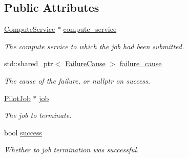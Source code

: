 \subsection*{Public Attributes}
\begin{DoxyCompactItemize}
\item 
\mbox{\label{classwrench_1_1_compute_service_terminate_pilot_job_answer_message_a7975aff8b6494bad7ee424d3afae8d1b}} 
\hyperlink{classwrench_1_1_compute_service}{Compute\+Service} $\ast$ \hyperlink{classwrench_1_1_compute_service_terminate_pilot_job_answer_message_a7975aff8b6494bad7ee424d3afae8d1b}{compute\+\_\+service}
\begin{DoxyCompactList}\small\item\em The compute service to which the job had been submitted. \end{DoxyCompactList}\item 
\mbox{\label{classwrench_1_1_compute_service_terminate_pilot_job_answer_message_afeeb546d25637b2ff8eb39b70b51e121}} 
std\+::shared\+\_\+ptr$<$ \hyperlink{classwrench_1_1_failure_cause}{Failure\+Cause} $>$ \hyperlink{classwrench_1_1_compute_service_terminate_pilot_job_answer_message_afeeb546d25637b2ff8eb39b70b51e121}{failure\+\_\+cause}
\begin{DoxyCompactList}\small\item\em The cause of the failure, or nullptr on success. \end{DoxyCompactList}\item 
\mbox{\label{classwrench_1_1_compute_service_terminate_pilot_job_answer_message_acc822617ab272e1f5a200af96c10090e}} 
\hyperlink{classwrench_1_1_pilot_job}{Pilot\+Job} $\ast$ \hyperlink{classwrench_1_1_compute_service_terminate_pilot_job_answer_message_acc822617ab272e1f5a200af96c10090e}{job}
\begin{DoxyCompactList}\small\item\em The job to terminate. \end{DoxyCompactList}\item 
\mbox{\label{classwrench_1_1_compute_service_terminate_pilot_job_answer_message_afa2b6acd7eb6b7ad23470402ef2badf0}} 
bool \hyperlink{classwrench_1_1_compute_service_terminate_pilot_job_answer_message_afa2b6acd7eb6b7ad23470402ef2badf0}{success}
\begin{DoxyCompactList}\small\item\em Whether to job termination was successful. \end{DoxyCompactList}\end{DoxyCompactItemize}
